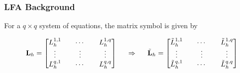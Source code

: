 \documentclass{beamer}
\begin{document}

\begin{frame}
\begin{center}
\frametitle{LFA Background}

For a $q \times q$ system of equations, the matrix symbol is given by

\begin{equation}
\mathbf{L}_h =
\begin{bmatrix}
    L_h^{1, 1} && \cdots && L_h^{1, q}        \\
    \vdots               && \vdots && \vdots  \\
    L_h^{q, 1} && \cdots && L_h^{q, q}        \\
\end{bmatrix}
\hspace{0.5cm}
\Rightarrow
\hspace{0.5cm}
\tilde{\mathbf{L}}_h =
\begin{bmatrix}
    \tilde{L}_h^{1, 1} && \cdots && \tilde{L}_h^{1, q}  \\
    \vdots             && \vdots && \vdots              \\
    \tilde{L}_h^{q, 1} && \cdots && \tilde{L}_h^{q, q}  \\
\end{bmatrix}
\end{equation}

\end{center}
\end{frame}

\end{document}
